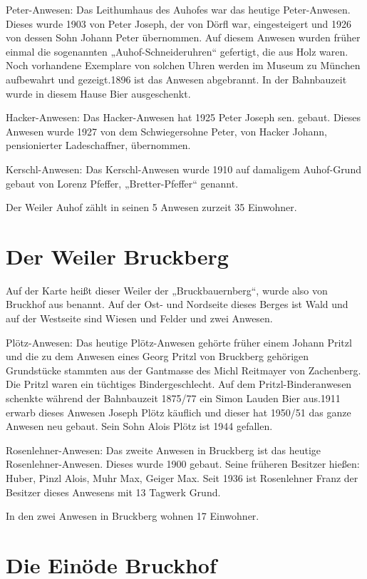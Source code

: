 \documentclass{book}
\begin{document}
Peter-Anwesen: Das Leithumhaus des Auhofes war das heutige Peter-Anwesen. Dieses
wurde 1903 von Peter Joseph, der von Dörfl war, eingesteigert und 1926 von
dessen Sohn Johann Peter übernommen. Auf diesem Anwesen wurden früher einmal die
sogenannten „Auhof-Schneideruhren“ gefertigt, die aus Holz waren. Noch
vorhandene Exemplare von solchen Uhren werden im Museum zu München aufbewahrt
und gezeigt.1896 ist das Anwesen abgebrannt. In der Bahnbauzeit wurde in diesem
Hause Bier ausgeschenkt.

Hacker-Anwesen: Das Hacker-Anwesen hat 1925 Peter Joseph sen. gebaut. Dieses
Anwesen wurde 1927 von dem Schwiegersohne Peter, von Hacker Johann,
pensionierter Ladeschaffner, übernommen.

Kerschl-Anwesen: Das Kerschl-Anwesen wurde 1910 auf damaligem Auhof-Grund gebaut
von Lorenz Pfeffer, „Bretter-Pfeffer“ genannt.

Der Weiler Auhof zählt in seinen 5 Anwesen zurzeit 35 Einwohner.

\section{Der Weiler Bruckberg}

Auf der Karte heißt dieser Weiler der „Bruckbauernberg“, wurde also von Bruckhof
aus benannt. Auf der Ost- und Nordseite dieses Berges ist Wald und auf der
Westseite sind Wiesen und Felder und zwei Anwesen.

Plötz-Anwesen: Das heutige Plötz-Anwesen gehörte früher einem Johann Pritzl und
die zu dem Anwesen eines Georg Pritzl von Bruckberg gehörigen Grundstücke
stammten aus der Gantmasse des Michl Reitmayer von Zachenberg. Die Pritzl waren
ein tüchtiges Bindergeschlecht. Auf dem Pritzl-Binderanwesen schenkte während
der Bahnbauzeit 1875/77 ein Simon Lauden Bier aus.1911 erwarb dieses Anwesen
Joseph Plötz käuflich und dieser hat 1950/51 das ganze Anwesen neu gebaut. Sein
Sohn Alois Plötz ist 1944 gefallen.

Rosenlehner-Anwesen: Das zweite Anwesen in Bruckberg ist das heutige
Rosenlehner-Anwesen. Dieses wurde 1900 gebaut. Seine früheren Besitzer hießen:
Huber, Pinzl Alois, Muhr Max, Geiger Max. Seit 1936 ist Rosenlehner Franz der
Besitzer dieses Anwesens mit 13 Tagwerk Grund.

In den zwei Anwesen in Bruckberg wohnen 17 Einwohner.

\section{Die Einöde Bruckhof}
\end{document}
